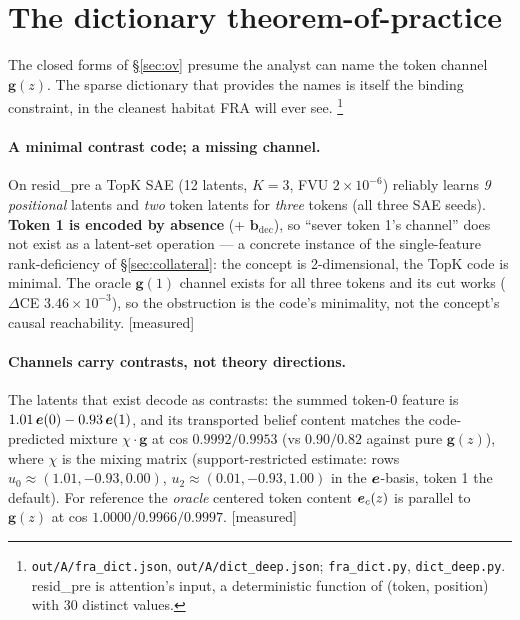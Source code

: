 \documentclass{article}
\newcommand{\gb}{\boldsymbol{g}}
\newcommand{\bdec}{\boldsymbol{b}_{\mathrm{dec}}}
\newcommand{\htag}[1]{{\normalfont\sffamily\footnotesize[#1]}}
\begin{document}
\section{The dictionary theorem-of-practice}\label{sec:dict}

The closed forms of \S\ref{sec:ov} presume the analyst can name the token channel
$\gb(z)$. The sparse dictionary that provides the names is itself the binding
constraint, in the cleanest habitat FRA will ever see.%
\footnote{\texttt{out/A/fra\_dict.json}, \texttt{out/A/dict\_deep.json};
\texttt{fra\_dict.py}, \texttt{dict\_deep.py}. resid\_pre is attention's input, a
deterministic function of (token, position) with 30 distinct values.}

\paragraph{A minimal contrast code; a missing channel.} On resid\_pre a TopK SAE (12
latents, $K=3$, FVU $2\times10^{-6}$) reliably learns \emph{9 positional} latents and
\emph{two} token latents for \emph{three} tokens (all three SAE seeds). \textbf{Token
1 is encoded by absence} (+ $\bdec$), so ``sever token 1's channel'' does not exist as
a latent-set operation --- a concrete instance of the single-feature rank-deficiency
of \S\ref{sec:collateral}: the concept is 2-dimensional, the TopK code is minimal. The
oracle $\gb(1)$ channel exists for all three tokens and its cut works
($\Delta$CE $3.46\times10^{-3}$), so the obstruction is the code's minimality, not the
concept's causal reachability. \htag{measured}

\paragraph{Channels carry contrasts, not theory directions.} The latents that exist
decode as contrasts: the summed token-0 feature is $1.01\,\boldsymbol{e}(0)-0.93\,\boldsymbol{e}(1)$, and its
transported belief content matches the code-predicted mixture $\chi\cdot\gb$ at cos
$0.9992/0.9953$ (vs $0.90/0.82$ against pure $\gb(z)$), where $\chi$ is the mixing
matrix (support-restricted estimate: rows $u_0\approx(1.01,-0.93,0.00)$,
$u_2\approx(0.01,-0.93,1.00)$ in the $\boldsymbol{e}$-basis, token 1 the default). For reference the \emph{oracle} centered token content $\boldsymbol{e}_c(z)$
is parallel to $\gb(z)$ at cos $1.0000/0.9966/0.9997$. \htag{measured}
\end{document}
